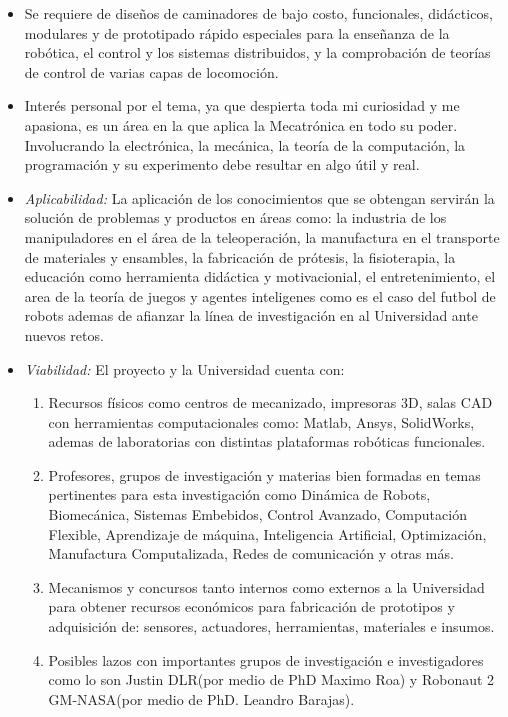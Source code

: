 \begin{itemize}
\item Se requiere de dise\~nos de caminadores de bajo costo, funcionales, did\'acticos, modulares y de prototipado r\'apido especiales para la ense\~nanza de la rob\'otica, el control y los sistemas distribuidos, y la comprobaci\'on de teor\'ias de control de varias capas de locomoci\'on.
\item Inter\'es personal por el tema, ya que despierta toda mi curiosidad y me apasiona, es un \'area en la que aplica la Mecatr\'onica en todo su poder. Involucrando la electr\'onica, la mec\'anica, la teor\'ia de la computaci\'on, la programaci\'on y su experimento debe resultar en algo \'util y real.
\item \emph{Aplicabilidad:} La aplicaci\'on de los conocimientos que se obtengan servir\'an la soluci\'on de problemas y productos en \'areas como: la industria de los manipuladores en el \'area de la teleoperaci\'on\cite{Treesatayapun2014,M2013}, la manufactura en el transporte de materiales y ensambles\cite{Roy2013}, la fabricaci\'on de pr\'otesis\cite{Roa2006}, la fisioterapia\cite{Kang2013}, la educaci\'on como herramienta did\'actica y motivacionial\cite{Ishida2004}, el entretenimiento, el area de la teor\'ia de juegos y agentes inteligenes como es el caso del futbol de robots ademas de afianzar la l\'inea de investigaci\'on en al Universidad ante nuevos retos\cite{Ishida2004}.
\item \emph{Viabilidad:} El proyecto y la Universidad cuenta con: 
  \begin{enumerate}[1)]
  \item Recursos f\'isicos como centros de mecanizado, impresoras 3D, salas CAD con herramientas computacionales como: Matlab, Ansys, SolidWorks, ademas de laboratorias con distintas plataformas rob\'oticas funcionales.
  \item Profesores, grupos de investigaci\'on y materias bien formadas en temas pertinentes para esta investigaci\'on como Din\'amica de Robots, Biomec\'anica, Sistemas Embebidos, Control Avanzado, Computaci\'on Flexible, Aprendizaje de m\'aquina, Inteligencia Artificial, Optimizaci\'on, Manufactura Computalizada, Redes de comunicaci\'on y otras m\'as.
  \item  Mecanismos y concursos tanto internos como externos a la Universidad para obtener recursos econ\'omicos para fabricaci\'on de prototipos y adquisici\'on de: sensores, actuadores, herramientas, materiales e insumos.
  \item Posibles lazos con importantes grupos de investigaci\'on e investigadores como lo son Justin DLR(por medio de PhD Maximo Roa) y Robonaut 2 GM-NASA(por medio de PhD. Leandro Barajas).

\end{enumerate}
\end{itemize}
